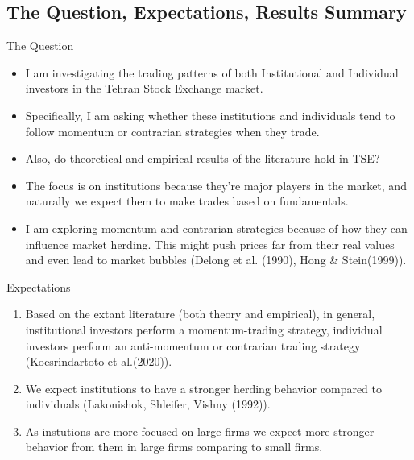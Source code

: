 \documentclass{beamer}
\begin{document}
\subsection{The Question, Expectations, Results Summary}


\begin{frame}{The Question}
    \begin{itemize}
        \item I am investigating the trading patterns of both Institutional and Individual investors in the Tehran Stock Exchange market.
        \item Specifically, I am asking whether these institutions and individuals tend to follow momentum or contrarian strategies when they trade.
        \item Also, do theoretical and empirical results of the literature hold in TSE?
        \item The focus is on institutions because they're major players in the market, and naturally we expect them to make trades based on fundamentals.
        \item I am exploring momentum and contrarian strategies because of how they can influence market herding. This might push prices far from their real values and even lead to market bubbles (Delong et al. (1990), Hong \& Stein(1999)).
    \end{itemize}
\end{frame}

\begin{frame}{Expectations}
    \begin{enumerate}
        \item Based on the extant literature (both theory and empirical), in general, institutional investors perform a momentum-trading strategy, individual investors perform an anti-momentum or contrarian trading strategy (Koesrindartoto et al.(2020)).
        \item We expect institutions to have a stronger herding behavior compared to individuals (Lakonishok, Shleifer, Vishny (1992)).
        \item As instutions are more focused on large firms we expect more stronger behavior from them in large firms comparing to small firms.
    \end{enumerate}
\end{frame}
\end{document}
